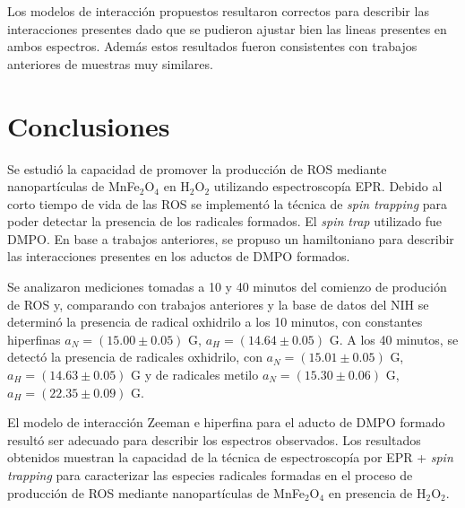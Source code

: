\documentclass[aps,prl,reprint,superscriptaddress,showkeys]{revtex4-2}
\begin{document}
Los modelos de interacción propuestos resultaron correctos para describir las interacciones presentes dado que se pudieron ajustar bien las lineas presentes en ambos espectros. Además estos resultados fueron consistentes con trabajos anteriores de muestras muy similares.

\section{Conclusiones}

Se estudió la capacidad de promover la producción de ROS mediante nanopartículas de MnFe$_2$O$_4$ en H$_2$O$_2$ utilizando espectroscopía EPR. Debido al corto tiempo de vida de las ROS se implementó la técnica de \textit{spin trapping} para poder detectar la presencia de los radicales formados. El \textit{spin trap} utilizado fue DMPO. En base a trabajos anteriores, se propuso un hamiltoniano para describir las interacciones presentes en los aductos de DMPO formados. 

Se analizaron mediciones tomadas a 10 y 40 minutos del comienzo de produción de ROS y, comparando con trabajos anteriores y la base de datos del NIH se determinó la presencia de radical oxhidrilo a los 10 minutos, con constantes hiperfinas $a_N = (15.00 \pm 0.05)$ G, $a_H =  (14.64 \pm 0.05)$ G. A los 40 minutos, se detectó la presencia de radicales oxhidrilo, con $a_N = (15.01 \pm 0.05)$ G, $a_H = (14.63 \pm 0.05)$ G y de radicales metilo $a_N = (15.30 \pm 0.06)$ G, $a_H = (22.35 \pm 0.09)$ G. 

El modelo de interacción Zeeman e hiperfina para el aducto de DMPO formado resultó ser adecuado para describir los espectros observados. Los resultados obtenidos muestran la capacidad de la técnica de espectroscopía por EPR + \textit{spin trapping} para caracterizar las especies radicales formadas en el proceso de producción de ROS mediante nanopartículas de MnFe$_2$O$_4$ en presencia de H$_2$O$_2$.




\end{document}
